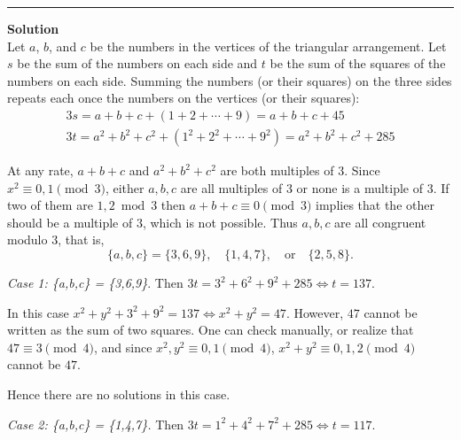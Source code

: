 \documentclass[12pt,oneside,a4paper]{book}
\newcommand{\sol}{\medskip\hrule\medbreak\textbf{Solution}\\}
\begin{document}
\sol
Let $a$, $b$, and $c$ be the numbers in the vertices of the triangular arrangement. Let $s$ be the sum of the numbers on each side and $t$ be the sum of the squares of the numbers on each side. Summing the numbers (or their squares) on the three sides repeats each once the numbers on the vertices (or their squares):
\begin{gather*}
3s = a+b+c + (1+2+\cdots+9) = a+b+c+45\\
3t = a^2+b^2+c^2 + (1^2+2^2+\cdots+9^2) = a^2+b^2+c^2+285
\end{gather*}

At any rate, $a+b+c$ and $a^2+b^2+c^2$ are both multiples of $3$. Since $x^2\equiv 0,1\pmod 3$, either $a,b,c$ are all multiples of $3$ or none is a multiple of $3$. If two of them are $1,2\bmod 3$ then $a+b+c\equiv 0\pmod 3$ implies that the other should be a multiple of $3$, which is not possible. Thus $a,b,c$ are all congruent modulo $3$, that is,
\[\{a,b,c\} = \{3,6,9\},\quad \{1,4,7\},\quad\text{or}\quad \{2,5,8\}.\]

\smallskip
\emph{Case 1: \{a,b,c\} = \{3,6,9\}}. Then $3t = 3^2+6^2+9^2 + 285 \iff t = 137$.
\begin{center}
\end{center}

In this case $x^2+y^2+3^2+9^2 = 137\iff x^2+y^2 = 47$. However, $47$ cannot be written as the sum of two squares. One can check manually, or realize that $47\equiv 3\pmod 4$, and since $x^2,y^2\equiv 0,1\pmod 4$, $x^2+y^2\equiv 0,1,2\pmod 4$ cannot be $47$.

Hence there are no solutions in this case.

\goodbreak
\smallskip
\emph{Case 2: \{a,b,c\} = \{1,4,7\}.} Then $3t = 1^2+4^2+7^2 + 285 \iff t = 117$.
\begin{center}
\end{center}
\end{document}
